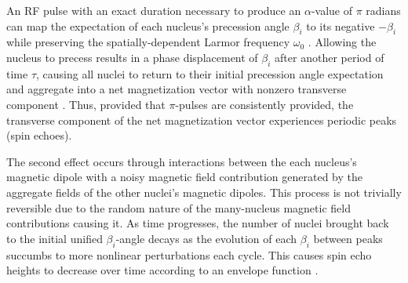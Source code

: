 \documentclass[11pt]{article}
\begin{document}
An RF pulse
with an exact duration
necessary to produce an $\alpha$-value of $\pi$ radians can map the
expectation of each nucleus's precession angle $\beta_i$ to its
negative $-\beta_i$ while preserving the spatially-dependent Larmor
frequency $\omega_0$ \cite{mel}. Allowing the nucleus to precess results in a
phase displacement of $\beta_i$
after another period of time $\tau$, causing all nuclei to return to
their initial
precession angle expectation and aggregate into a net magnetization
vector with nonzero
transverse component \cite{mel}. Thus, provided that $\pi$-pulses are
consistently provided,
the transverse component of the net magnetization vector experiences
periodic peaks (spin echoes).

The second effect occurs through interactions between the
each nucleus's magnetic dipole with a noisy magnetic field
contribution generated by the
aggregate fields of the other nuclei's magnetic dipoles. This process is
not trivially reversible due to the random nature of the many-nucleus
magnetic field contributions causing it. As time progresses, the
number of nuclei brought back
to the initial unified $\beta_i$-angle decays as the evolution of each
$\beta_i$ between peaks succumbs to more nonlinear perturbations each
cycle. This causes spin echo heights to decrease over time according
to an envelope function \cite{kittel, ashcroft_mermin, mel}.
\end{document}
